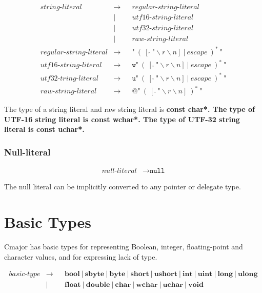 \documentclass[a4paper,oneside,11pt]{article}
\begin{document}
\begin{align*}
string\textrm{-}literal &\rightarrow & &regular\textrm{-}string\textrm{-}literal\\
&| & &utf16\textrm{-}string\textrm{-}literal\\
&| & &utf32\textrm{-}string\textrm{-}literal\\
&| & &raw\textrm{-}string\textrm{-}literal\\
regular\textrm{-}string\textrm{-}literal &\rightarrow & &\texttt{"} \> ( \> [\> \hat{} \> \texttt{"} \backslash r \backslash n] \> | \>
\hyperref[escape]{escape} \>)^* \>
\texttt{"}\\
utf16\textrm{-}string\textrm{-}literal &\rightarrow & &\texttt{w}\texttt{"} \>
( \> [\> \hat{} \> \texttt{"} \backslash r \backslash n] \> | \> \hyperref[escape]{escape} \>)^*
\> \texttt{"}\\
utf32\textrm{-}tring\textrm{-}literal &\rightarrow & &\texttt{u}\texttt{"} \> ( \> [\> \hat{} \> \texttt{"} \backslash r \backslash n] \> | \>
\hyperref[escape]{escape} \>)^*
\> \texttt{"}\\
raw\textrm{-}string\textrm{-}literal &\rightarrow  & &\texttt{@} \texttt{"} \> ( \> [\> \hat{} \> \texttt{"} \backslash r \backslash n] \> )^* \> \texttt{"}
\end{align*}

The type of a string literal and raw string literal is \bf{const char*}.
The type of UTF-16 string literal is \bf{const wchar*}.
The type of UTF-32 string literal is \bf{const uchar*}.

\subsubsection{Null-literal}\label{nullliteral}

\begin{align*}
null\textrm{-}literal &\rightarrow \texttt{null}
\end{align*}

The null literal can be implicitly converted to any pointer or delegate type.

\section{Basic Types}\label{sec:basictypes}\label{basictype}

Cmajor has basic types for representing Boolean, integer, floating-point and character values,
and for expressing lack of type.

\begin{align*}
basic\textrm{-}type &\rightarrow & &\textbf{bool} \> | \> \textbf{sbyte} \> | \> \textbf{byte} \> | \> \textbf{short} \> | \> \textbf{ushort}
\> | \> \textbf{int} \> | \> \textbf{uint} \> | \> \textbf{long} \> | \> \textbf{ulong}\\
&| & &\textbf{float} \> | \> \textbf{double} \> | \> \textbf{char} \> | \> \textbf{wchar} \> | \> \textbf{uchar} \> | \> \textbf{void}
\end{align*}
\end{document}
